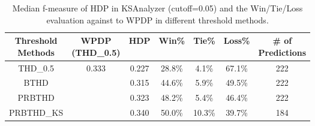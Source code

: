 \begin{table}[t]
\scriptsize
\centering
\caption{Median f-measure of HDP in KSAnalyzer (cutoff=0.05) and the Win/Tie/Loss evaluation against to WPDP in different threshold methods. 
}
\label{tab:threshold_result}
\begin{tabular}{|c||@{}c@{}||c||c|c|c||@{}c@{}|}
\hline

\specialcell{{\bf Threshold}\\{\bf Methods}}
& \specialcell{{\bf WPDP}\\{\bf (THD\_0.5)}}
& {\bf HDP}
& {\bf Win}\%
& {\bf Tie}\% 
& {\bf Loss}\%
& \specialcell{{\bf \# of}\\{\bf Predictions}} \\ \hline
THD\_0.5 & \multirow{4}{*}{0.333} & 0.227	& 28.8\% & 4.1\%	& 67.1\% & 222\\ \cline{1-1} \cline{3-7}
BTHD & & 0.315	& 44.6\% & 5.9\%	& 49.5\% & 222\\ \cline{1-1} \cline{3-7}
PRBTHD & & 0.323	& 48.2\% & 5.4\%	& 46.4\% & 222\\ \cline{1-1} \cline{3-7}
PRBTHD\_KS& & 0.340	& 50.0\% & 10.3\%	& 39.7\% & 184\\ \hline



\end{tabular}
\end{table}


